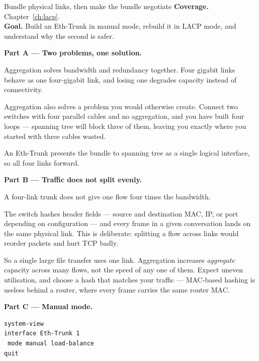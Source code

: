 
\begin{labproject}{Bundle physical links, then make the bundle negotiate}
\textbf{Coverage.} Chapter~\ref{ch:lacp}.\\
\textbf{Goal.} Build an Eth-Trunk in manual mode, rebuild it in LACP mode, and understand why the second is safer.

\medskip\noindent\textbf{Part A --- Two problems, one solution.}\par
Aggregation solves bandwidth and redundancy together. Four gigabit links behave as one four-gigabit link, and losing one degrades capacity instead of connectivity.

\begin{keyidea}
Aggregation also solves a problem you would otherwise create. Connect two switches with four parallel cables and no aggregation, and you have built four loops --- spanning tree will block three of them, leaving you exactly where you started with three cables wasted.

An Eth-Trunk presents the bundle to spanning tree as a single logical interface, so all four links forward.
\end{keyidea}

\medskip\noindent\textbf{Part B --- Traffic does not split evenly.}\par

\begin{pitfall}
A four-link trunk does not give one flow four times the bandwidth.

The switch hashes header fields --- source and destination MAC, IP, or port depending on configuration --- and every frame in a given conversation lands on the same physical link. This is deliberate: splitting a flow across links would reorder packets and hurt TCP badly.

So a single large file transfer uses one link. Aggregation increases \emph{aggregate} capacity across many flows, not the speed of any one of them. Expect uneven utilisation, and choose a hash that matches your traffic --- MAC-based hashing is useless behind a router, where every frame carries the same router MAC.
\end{pitfall}

\medskip\noindent\textbf{Part C --- Manual mode.}\par

\begin{lstlisting}[style=dcnterminal]
system-view
interface Eth-Trunk 1
 mode manual load-balance
quit


\end{lstlisting}
\end{labproject}
